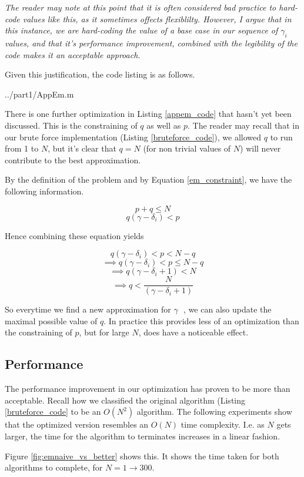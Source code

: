 \documentclass[10pt]{article}
\newcommand*{\gam}{$\gamma \text{ }$}
\newcommand*{\gami}{$\gamma_{i} \text{ }$}
\begin{document}
\emph{The reader may note at this point that it is often considered bad practice to hard-code values like this, as it sometimes offects flexiblilty. However, I argue that in this instance, we are hard-coding the value of a base case in our sequence of \gami values, and that it's performance improvement, combined with the legibility of the code makes it an acceptable approach.}

Given this justification, the code listing is as follows.

   {../part1/AppEm.m}

There is one further optimization in Listing \ref{appem_code} that hasn't yet been discussed. This is the constraining of $q$ as well as $p$. The reader may recall that in our brute force implementation (Listing \ref{bruteforce_code}), we allowed $q$ to run from 1 to $N$, but it's clear that $q = N$ (for non trivial values of $N$) will never contribute to the best approximation.

By the definition of the problem and by Equation \ref{em_constraint}, we have the following information.

$$ p + q \leq N $$
$$ q (\gamma - \delta_i) < p $$

Hence combining these equation yields

$$ q (\gamma - \delta_i) < p < N - q $$ 
$$ \implies  q (\gamma - \delta_i) < p \leq N - q $$ 
$$ \implies q (\gamma - \delta_i + 1) < N  $$ 
$$ \implies q  < \frac{N}{(\gamma - \delta_i + 1)}  $$ 

So everytime we find a new approximation for \gam, we can also update the maximal possible value of $q$. In practice this provides less of an optimization than the constraining of $p$, but for large $N$, does have a noticeable effect.

\subsection{Performance}

The performance improvement in our optimization has proven to be more than acceptable. Recall how we classified the original algorithm (Listing \ref{bruteforce_code} to be an $O(N^2)$ algorithm. The following experiments show that the optimized version resembles an $O(N)$ time complexity. I.e. as $N$ gets larger, the time for the algorithm to terminates increases in a linear fashion.

Figure \ref{fig:emnaive_vs_better} shows this. It shows the time taken for both algorithms to complete, for $N = 1 \rightarrow 300$.
\end{document}
